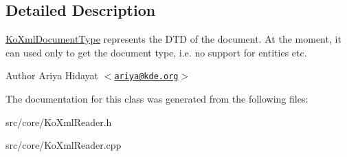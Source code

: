 \subsection{Detailed Description}
\hyperlink{classKoXmlDocumentType}{KoXmlDocumentType} represents the DTD of the document. At the moment, it can used only to get the document type, i.e. no support for entities etc.

\begin{DoxyAuthor}{Author}
Ariya Hidayat $<$\href{mailto:ariya@kde.org}{\tt ariya@kde.org}$>$ 
\end{DoxyAuthor}


The documentation for this class was generated from the following files:\begin{DoxyCompactItemize}
\item 
src/core/KoXmlReader.h\item 
src/core/KoXmlReader.cpp\end{DoxyCompactItemize}
